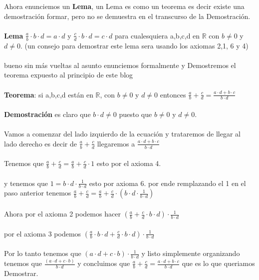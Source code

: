 \documentclass{article}
\begin{document}
Ahora enunciemos un \textbf{Lema}, un Lema es como un teorema es decir existe una demostración formar, pero no se 
demuestra en el transcurso de la Demostración. 
\\ \\ 
\textbf{Lema} $\frac{a}{b}\cdot b \cdot d = a \cdot d $  y $\frac{c}{d} \cdot b \cdot d = c \cdot d$ para cualesquiera a,b,c,d en $\mathbb R$
con $b \not = 0$ y $d \not = 0$. (un consejo para demostrar este lema sera usando los axiomas 2,1, 6 y 4) 
\\ \\ 
bueno sin más vueltas al asunto enunciemos formalmente y Demostremos el teorema expuesto al principio de este blog \\ \\ 
\textbf{Teorema}: si a,b,c,d están en $\mathbb R$, con $b \not = 0$ y $d \not = 0$ entonces $\frac{a}{b}+\frac{c}{d}=\frac{a \cdot d + b \cdot c}{b \cdot d}$
\\ \\
\textbf{Demostración} es claro que $b \cdot d \not = 0$ puesto que $b \not = 0$ y $d \not = 0$.
\\ \\ 
Vamos a comenzar del lado izquierdo de la ecuación y trataremos de llegar al lado derecho es decir de $\frac{a}{b}+\frac{c}{d}$
llegaremos a $\frac{a \cdot d + b \cdot c}{b \cdot d}$
\\ \\
Tenemos que $\frac{a}{b}+\frac{c}{d}= \frac{a}{b}+\frac{c}{d} \cdot 1$ esto por el axioma 4.
\\ \\
y tenemos que $1 = b \cdot d \cdot \frac{1}{b \cdot d}$ esto por axioma 6. por ende remplazando el 1 en el paso anterior tenemos
$\frac{a}{b}+\frac{c}{d}= \frac{a}{b}+\frac{c}{d} \cdot (b \cdot d \cdot \frac{1}{b \cdot d}) $ 
\\ \\ 
Ahora por el axioma 2 podemos hacer $(\frac{a}{b}+\frac{c}{d} \cdot b \cdot d )\cdot \frac{1}{b \cdot d}$
\\ \\ 
por el axioma 3 podemos $(\frac{a}{b}\cdot b \cdot d + \frac{c}{d} \cdot b \cdot d) \cdot \frac{1}{b \cdot d}$
\\ \\ Por lo tanto tenemos que $(a \cdot d + c \cdot b) \cdot \frac{1}{b \cdot d}$ y listo simplemente organizando tenemos que $\frac{(a \cdot d + c \cdot b)}{b \cdot d} $
y concluimos que $\frac{a}{b}+\frac{c}{d}=\frac{a \cdot d + b \cdot c}{b \cdot d}$ que es lo que queriamos Demostrar.
\end{document}
